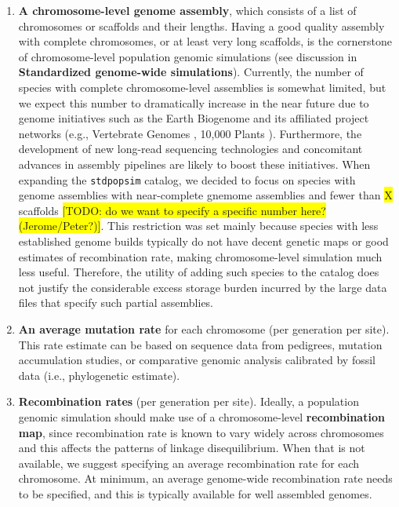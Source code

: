 \documentclass[hidelinks]{article}
\newcommand{\stdpopsim}{\texttt{stdpopsim}\xspace}
\begin{document}
\begin{enumerate}
\def\labelenumi{\arabic{enumi}.}
\item
  \textbf{A chromosome-level genome assembly}, which consists of a list of chromosomes or scaffolds and their lengths. Having a good quality assembly with complete chromosomes, or at least very long scaffolds, is the cornerstone of chromosome-level population genomic simulations (see discussion in \textbf{Standardized genome-wide simulations}). Currently, the number of species with complete chromosome-level assemblies is somewhat limited, but we expect this number to dramatically increase in the near future due to genome initiatives such as the Earth Biogenome \citep{Lewin2022} and its affiliated project networks (e.g.,
  Vertebrate Genomes \citep{Rhie2021}, 10,000 Plants \citep{Cheng2018}).
  Furthermore, the development of new long-read sequencing technologies
  \citep{Amarasinghe2020} and concomitant advances in assembly pipelines
  \citep{Chakraborty2016} are likely to boost these initiatives. When expanding the \stdpopsim catalog, we decided to focus on species with genome assemblies with near-complete gnemome assemblies and fewer than \colorbox{yellow}{X} scaffolds 
  \colorbox{yellow}{[TODO: do we want to specify a specific number here? (Jerome/Peter?)]}. This restriction was set mainly because species with less established genome builds typically do not have decent genetic maps or good estimates of recombination rate, making chromosome-level simulation much less useful. Therefore, the utility of adding such species to the catalog does not justify the considerable excess storage burden incurred by the large data files that specify such partial assemblies. 
  

  
  
\item
  \textbf{An average mutation rate} for each chromosome (per generation per site).  
  This rate estimate can be based on sequence data from pedigrees, mutation accumulation studies, or comparative genomic analysis calibrated by fossil data (i.e., phylogenetic estimate). 
  
\item
  \textbf{Recombination rates} (per generation per site).  
  Ideally, a population genomic simulation should make use of a chromosome-level \textbf{recombination map}, since recombination rate is known to vary widely across chromosomes and this affects the patterns of linkage disequilibrium. When that is not available, we suggest specifying an average recombination rate for each chromosome.
  At minimum, an average genome-wide recombination rate needs to be specified, and this is typically available for well assembled genomes. 
  

\end{enumerate}
\end{document}
